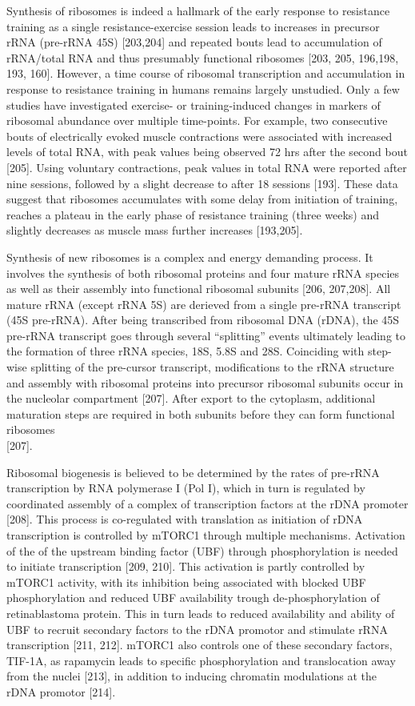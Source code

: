 \documentclass[twoside,10pt]{gihclass} %
\begin{document}
Synthesis of ribosomes is indeed a hallmark of the early response to resistance training as a single resistance-exercise session leads to increases in precursor rRNA (pre-rRNA 45S)
{[}203,204{]}
and repeated bouts lead to accumulation of rRNA/total RNA and thus presumably functional ribosomes
{[}203, 205, 196,198, 193, 160{]}.
However, a time course of ribosomal transcription and accumulation in response to resistance training in humans remains largely unstudied.
Only a few studies have investigated exercise- or training-induced changes in markers of ribosomal abundance over multiple time-points.
For example, two consecutive bouts of electrically evoked muscle contractions were associated with increased levels of total RNA, with peak values being observed 72 hrs after the second bout
{[}205{]}.
Using voluntary contractions, peak values in total RNA were reported after nine sessions, followed by a slight decrease to after 18 sessions {[}193{]}.
These data suggest that ribosomes accumulates with some delay from initiation of training, reaches a plateau in the early phase of resistance training (three weeks) and slightly decreases as muscle mass further increases
{[}193,205{]}.

Synthesis of new ribosomes is a complex and energy demanding process. It involves the synthesis of both ribosomal proteins and four mature rRNA species as well as their assembly into functional ribosomal subunits
{[}206, 207,208{]}.
All mature rRNA (except rRNA 5S) are derieved from a single pre-rRNA transcript (45S pre-rRNA). After being transcribed from ribosomal DNA (rDNA), the 45S pre-rRNA transcript goes through several ``splitting'' events ultimately leading to the formation of three rRNA species, 18S, 5.8S and 28S. Coinciding with step-wise splitting of the pre-cursor transcript, modifications to the rRNA structure and assembly with ribosomal proteins into precursor ribosomal subunits occur in the nucleolar compartment
{[}207{]}.
After export to the cytoplasm, additional maturation steps are required in both subunits before they can form functional ribosomes\\
{[}207{]}.

Ribosomal biogenesis is believed to be determined by the rates of pre-rRNA transcription by RNA polymerase I (Pol I), which in turn is regulated by coordinated assembly of a complex of transcription factors at the rDNA promoter
{[}208{]}.
This process is co-regulated with translation as initiation of rDNA transcription is controlled by mTORC1 through multiple mechanisms.
Activation of the of the upstream binding factor (UBF) through phosphorylation is needed to initiate transcription
{[}209, 210{]}.
This activation is partly controlled by mTORC1 activity, with its inhibition being associated with blocked UBF phosphorylation and reduced UBF availability trough de-phosphorylation of retinablastoma protein.
This in turn leads to reduced availability and ability of UBF to recruit secondary factors to the rDNA promotor and stimulate rRNA transcription
{[}211, 212{]}.
mTORC1 also controls one of these secondary factors, TIF-1A, as rapamycin leads to specific phosphorylation and translocation away from the nuclei
{[}213{]},
in addition to inducing chromatin modulations at the rDNA promotor
{[}214{]}.
\end{document}
